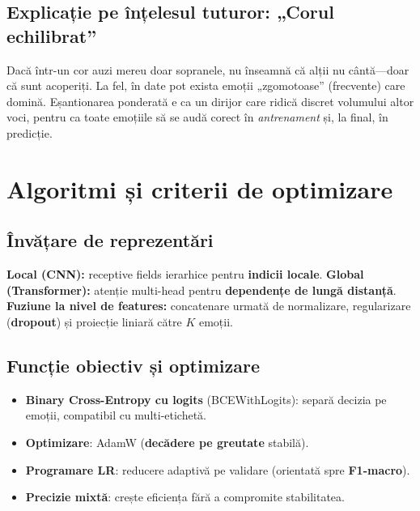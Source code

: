 \subsection{Explicație pe înțelesul tuturor: „Corul echilibrat”}
Dacă într-un cor auzi mereu doar sopranele, nu înseamnă că alții nu cântă—doar că sunt acoperiți. La fel, în date pot exista emoții „zgomotoase” (frecvente) care domină. Eșantionarea ponderată e ca un dirijor care ridică discret volumului altor voci, pentru ca toate emoțiile să se audă corect în \emph{antrenament} și, la final, în predicție.

\section{Algoritmi și criterii de optimizare}
\label{sec:algoritmi}

\subsection{Învățare de reprezentări}
\textbf{Local (CNN):} receptive fields ierarhice pentru \textbf{indicii locale}. 
\textbf{Global (Transformer):} atenție multi-head pentru \textbf{dependențe de lungă distanță}. 
\textbf{Fuziune la nivel de features:} concatenare urmată de normalizare, regularizare (\textbf{dropout}) și proiecție liniară către $K$ emoții.

\subsection{Funcție obiectiv și optimizare}
\begin{itemize}
  \item \textbf{Binary Cross-Entropy cu logits} (BCEWithLogits): separă decizia pe emoții, compatibil cu multi-etichetă.
  \item \textbf{Optimizare}: AdamW (\textbf{decădere pe greutate} stabilă).
  \item \textbf{Programare LR}: reducere adaptivă pe validare (orientată spre \textbf{F1-macro}).
  \item \textbf{Precizie mixtă}: crește eficiența fără a compromite stabilitatea.
\end{itemize}


